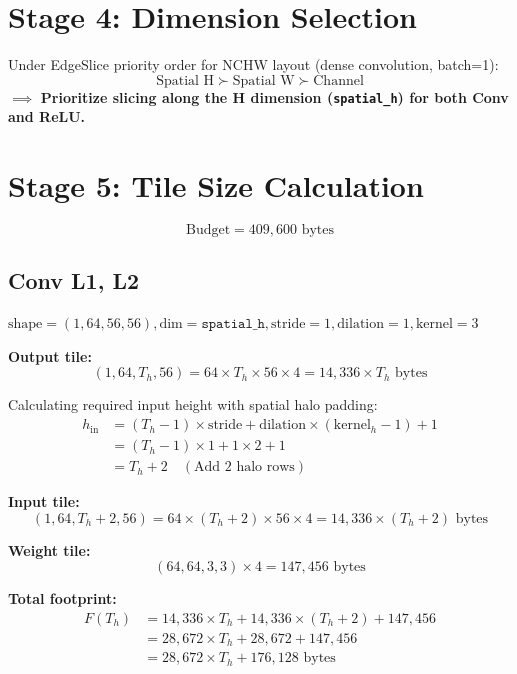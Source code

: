 \documentclass[11pt,a4paper]{article}
\begin{document}
\newpage

\section{Stage 4: Dimension Selection}

Under EdgeSlice priority order for NCHW layout (dense convolution, batch=1):
$$\text{Spatial H} \succ \text{Spatial W} \succ \text{Channel}$$
$\implies$ \textbf{Prioritize slicing along the H dimension (\texttt{spatial\_h}) for both Conv and ReLU.}

\section{Stage 5: Tile Size Calculation}

$$\text{Budget} = 409,600\text{ bytes}$$

\subsection{Conv L1, L2}
$\text{shape} = (1, 64, 56, 56), \text{dim} = \texttt{spatial\_h}, \text{stride}=1, \text{dilation}=1, \text{kernel}=3$

\textbf{Output tile:}
$$(1, 64, T_h, 56) = 64 \times T_h \times 56 \times 4 = 14,336 \times T_h\text{ bytes}$$

Calculating required input height with spatial halo padding:
\begin{align*}
h_{\text{in}} &= (T_h - 1) \times \text{stride} + \text{dilation} \times (\text{kernel}_h - 1) + 1 \\
&= (T_h - 1) \times 1 + 1 \times 2 + 1 \\
&= T_h + 2 \quad (\text{Add 2 halo rows})
\end{align*}

\textbf{Input tile:}
$$(1, 64, T_h + 2, 56) = 64 \times (T_h + 2) \times 56 \times 4 = 14,336 \times (T_h + 2)\text{ bytes}$$

\textbf{Weight tile:}
$$(64, 64, 3, 3) \times 4 = 147,456\text{ bytes}$$

\textbf{Total footprint:}
\begin{align*}
F(T_h) &= 14,336 \times T_h + 14,336 \times (T_h + 2) + 147,456 \\
&= 28,672 \times T_h + 28,672 + 147,456 \\
&= 28,672 \times T_h + 176,128\text{ bytes}
\end{align*}
\end{document}
